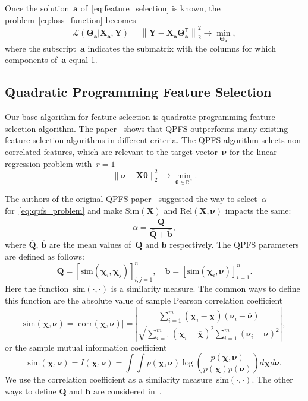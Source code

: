 \documentclass[12pt,twoside]{article}
\theoremstyle{definition}
\newcommand{\ba}{\mathbf{a}}
\newcommand{\bb}{\mathbf{b}}
\newcommand{\bY}{\mathbf{Y}}
\newcommand{\bX}{\mathbf{X}}
\newcommand{\bQ}{\mathbf{Q}}
\newcommand{\bbR}{\mathbb{R}}
\newcommand{\T}{\mathsf{T}}
\newcommand{\bchi}{\boldsymbol{\chi}}
\newcommand{\bnu}{\boldsymbol{\nu}}
\newcommand{\btheta}{\boldsymbol{\theta}}
\newcommand{\bTheta}{\boldsymbol{\Theta}}
\begin{document}
Once the solution~$\ba$ of~\eqref{eq:feature_selection} is known, the problem~\eqref{eq:loss_function} becomes
\begin{equation*}
\mathcal{L}(\bTheta_{\ba} | \bX_{\ba}, \bY) = {\left\| \mathbf{Y} - \bX_{\ba}\bTheta^{\T}_{\ba} \right\| }_2^2 \rightarrow\min_{\bTheta_{\ba}},
\end{equation*}
where the subscript~$\ba$ indicates the submatrix with the columns for which components of~$\ba$ equal 1.

\subsection{Quadratic Programming Feature Selection}
Our base algorithm for feature selection is quadratic programming feature selection algorithm. 
The paper~\cite{katrutsa2017comprehensive} shows that QPFS outperforms many existing feature selection algorithms in different criteria.
The QPFS algorithm selects non-correlated features, which are relevant to the target vector~$\bnu$ for the linear regression problem with~$r=1$
\begin{equation*}
\| \bnu - \bX \btheta\|_2^2 \rightarrow\min_{\btheta \in \bbR^{n}}.
\end{equation*}

The authors of the original QPFS paper~\cite{rodriguez2010quadratic} suggested the way to select~$\alpha$ for~\eqref{eq:qpfs_problem} and make $\text{Sim}(\bX)$ and $\text{Rel}(\bX, \bnu)$ impacts the same:
\begin{equation*}
\alpha = \frac{\overline{\bQ}}{\overline{\bQ} + \overline{\bb}},
\end{equation*}
where $\overline{\bQ}$, $\overline{\bb}$ are the mean values of~$\bQ$ and $\bb$ respectively. The QPFS parameters are defined as follows:
\begin{equation}
\bQ = \left[\text{sim}(\bchi_i, \bchi_j)\right]_{i,j=1}^n, \quad \bb = \left[\text{sim}(\bchi_i, \bnu)\right]_{i=1}^n.
\label{eq:qpfs_1d_qb}
\end{equation}
Here the function~$\text{sim}(\cdot, \cdot)$ is a similarity measure.
The common ways to define this function are the absolute value of sample Pearson correlation coefficient
\begin{equation*}
\text{sim}(\bchi, \bnu) = |\text{corr}(\bchi, \bnu)| = \left|\frac{\sum_{i=1}^m(\bchi_i - \overline{\bchi})( \bnu_i - \overline{\bnu})}{\sqrt{\sum_{i=1}^m(\bchi_i - \overline{\bchi})^2\sum_{i=1}^m(\bnu_i - \overline{\bnu})^2}}\right|,
\end{equation*}
or the sample mutual information coefficient
\begin{equation*}
\text{sim}(\bchi, \bnu) = I(\bchi, \bnu) = \int \int p(\bchi, \bnu) \log(\frac{p(\bchi, \bnu)}{p(\bchi)p(\bnu)}) d\bchi d\bnu.
\end{equation*}
We use the correlation coefficient as a similarity measure~$\text{sim}(\cdot, \cdot)$.
The other ways to define $\bQ$ and $\bb$ are considered in~\cite{katrutsa2017comprehensive}.
\end{document}

